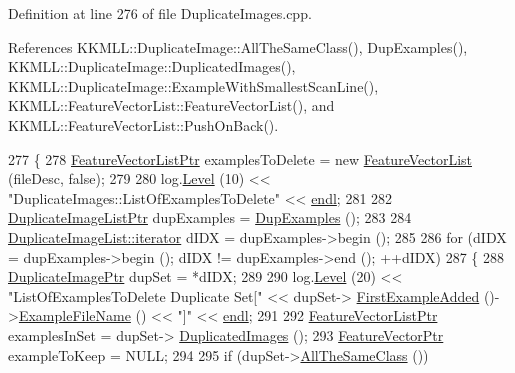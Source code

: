 Definition at line 276 of file Duplicate\+Images.\+cpp.



References K\+K\+M\+L\+L\+::\+Duplicate\+Image\+::\+All\+The\+Same\+Class(), Dup\+Examples(), K\+K\+M\+L\+L\+::\+Duplicate\+Image\+::\+Duplicated\+Images(), K\+K\+M\+L\+L\+::\+Duplicate\+Image\+::\+Example\+With\+Smallest\+Scan\+Line(), K\+K\+M\+L\+L\+::\+Feature\+Vector\+List\+::\+Feature\+Vector\+List(), and K\+K\+M\+L\+L\+::\+Feature\+Vector\+List\+::\+Push\+On\+Back().


\begin{DoxyCode}
277 \{
278   \hyperlink{class_k_k_m_l_l_1_1_feature_vector_list}{FeatureVectorListPtr}  examplesToDelete = \textcolor{keyword}{new} 
      \hyperlink{class_k_k_m_l_l_1_1_feature_vector_list}{FeatureVectorList} (fileDesc, \textcolor{keyword}{false});
279 
280   log.\hyperlink{class_k_k_b_1_1_run_log_a32cf761d7f2e747465fd80533fdbb659}{Level} (10) << \textcolor{stringliteral}{"DuplicateImages::ListOfExamplesToDelete"} << \hyperlink{namespace_k_k_b_ad1f50f65af6adc8fa9e6f62d007818a8}{endl};
281 
282   \hyperlink{class_k_k_m_l_l_1_1_duplicate_image_list}{DuplicateImageListPtr}  dupExamples = \hyperlink{class_k_k_m_l_l_1_1_duplicate_images_a63a339b4fe4a6626d30ca55438b4e24c}{DupExamples} ();
283 
284   \hyperlink{class_k_k_b_1_1_k_k_queue_aa3c2796a726eea468b94132a9fbf2cfe}{DuplicateImageList::iterator}  dIDX = dupExamples->begin ();
285 
286   \textcolor{keywordflow}{for}  (dIDX = dupExamples->begin ();   dIDX != dupExamples->end ();  ++dIDX)
287   \{
288     \hyperlink{class_k_k_m_l_l_1_1_duplicate_image}{DuplicateImagePtr} dupSet = *dIDX;
289 
290     log.\hyperlink{class_k_k_b_1_1_run_log_a32cf761d7f2e747465fd80533fdbb659}{Level} (20) << \textcolor{stringliteral}{"ListOfExamplesToDelete   Duplicate Set["} << dupSet->
      \hyperlink{class_k_k_m_l_l_1_1_duplicate_image_ab005d27fa527c46b5b15fd77945680eb}{FirstExampleAdded} ()->\hyperlink{class_k_k_m_l_l_1_1_feature_vector_ab47c89ab1e9396664fdc0dc34b6e1ab5}{ExampleFileName} () << \textcolor{stringliteral}{"]"} << 
      \hyperlink{namespace_k_k_b_ad1f50f65af6adc8fa9e6f62d007818a8}{endl};
291 
292     \hyperlink{class_k_k_m_l_l_1_1_feature_vector_list}{FeatureVectorListPtr}  examplesInSet = dupSet->
      \hyperlink{class_k_k_m_l_l_1_1_duplicate_image_ac5508ceab803834254df40c3f0d8d345}{DuplicatedImages} ();
293     \hyperlink{class_k_k_m_l_l_1_1_feature_vector}{FeatureVectorPtr} exampleToKeep = NULL;
294 
295     \textcolor{keywordflow}{if}  (dupSet->\hyperlink{class_k_k_m_l_l_1_1_duplicate_image_a0d325032b258151a62ea1b757e2862aa}{AllTheSameClass} ())

\end{DoxyCode}
